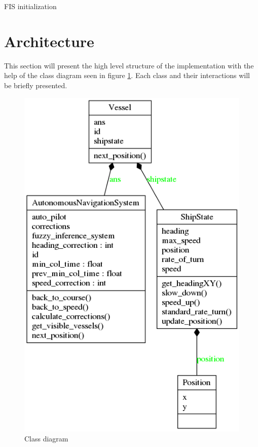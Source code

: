 \begin{listing}[h]
    \inputminted[linenos, breaklines=true,fontsize=\scriptsize, numberblanklines=false]{python}{../src/example.py}
    \caption{FIS initialization}
    \label{listing:fis}
\end{listing}

\section{Architecture}
This section will present the high level structure of the implementation with the help of the class diagram seen in figure \ref{fig:class_diagram}. Each class and their interactions will be briefly presented.
\begin{figure}[h]
    \centering
    \includegraphics[width=\textwidth,height=0.75\textheight,keepaspectratio]{../src/classes_Pyreverse}
    \caption{Class diagram}
    \label{fig:class_diagram}
\end{figure}
